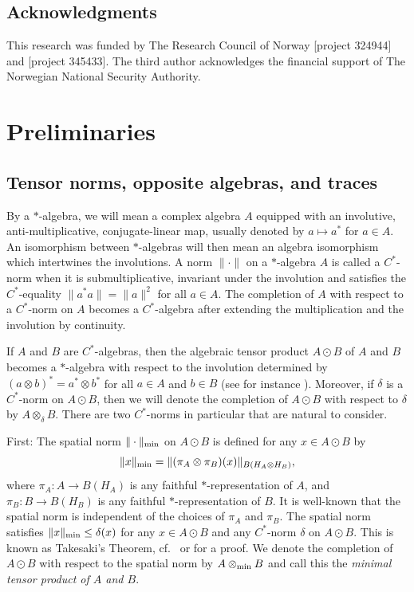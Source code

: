 \documentclass[11pt, a4paper, oneside, final, reqno]{amsart}
\theoremstyle{definition}
\theoremstyle{plain}
\theoremstyle{remark}
\numberwithin{equation}{section}
\begin{document}
\subsection*{Acknowledgments}
This research was funded by The Research Council of Norway [project 324944] and [project 345433]. The third author acknowledges the financial support of The Norwegian National Security Authority.

\section{Preliminaries}\label{sec:prelims}

\subsection{Tensor norms, opposite algebras, and traces}\label{sec:tensor-norms-etc}

By a $*$-algebra, we will mean a complex algebra $A$ equipped with an involutive, anti-multiplicative, conjugate-linear map, usually denoted by $a \mapsto a^*$ for $a \in A$. An isomorphism between $*$-algebras will then mean an algebra isomorphism which intertwines the involutions. A norm $\|\cdot\|$ on a $*$-algebra $A$ is called a $C^*$-norm when it is submultiplicative, invariant under the involution and satisfies the $C^*$-equality $\|a^* a\| = \|a\|^2$ for all $a\in A$. The completion of $A$ with respect to a $C^*$-norm on $A$ becomes a $C^*$-algebra after extending the multiplication and the involution by continuity.

If $A$ and $B$ are $C^*$-algebras, then the algebraic tensor product $A \odot B$ of $A$ and $B$ becomes a $*$-algebra with respect to the involution determined by $(a \otimes b)^* = a^* \otimes b^*$ for all $a \in A$ and $b \in B$ (see for instance \cite[p.~188-189]{Murphy1990}). Moreover, if $\delta$ is a $C^*$-norm on $A \odot B$, then we  will denote the completion of $A \odot B$ with respect to $\delta$ by $A \otimes_\delta B$. There are two $C^*$-norms in particular that are natural to consider.

First: The spatial norm $\| \cdot \|_{\rm min}$ on $A \odot B$ is defined for any $x \in A \odot B$ by
\begin{equation*}
    \|x\|_{\rm min} = \|(\pi_A \otimes \pi_B)(x)\|_{B(H_A \otimes H_B)},
\end{equation*}
where $\pi_A \colon A \to B(H_A)$ is any faithful $*$-representation of $A$, and $\pi_B \colon B \to B(H_B)$ is any faithful $*$-representation of $B$. It is well-known that the spatial norm is independent of the choices of $\pi_A$ and $\pi_B$. The spatial norm satisfies $\|x\|_{\rm min} \leq \delta(x)$ for any $x \in A \odot B$ and any $C^*$-norm $\delta$ on $A \odot B$. This is known as Takesaki's Theorem, cf.~\cite[Section 6.4]{Murphy1990} or \cite[Section 3.4]{BO} for a proof. We denote the completion of $A \odot B$ with respect to the spatial norm by $A \otimes_{\rm min} B$ and call this the \emph{minimal tensor product of $A$ and $B$}.
\end{document}
